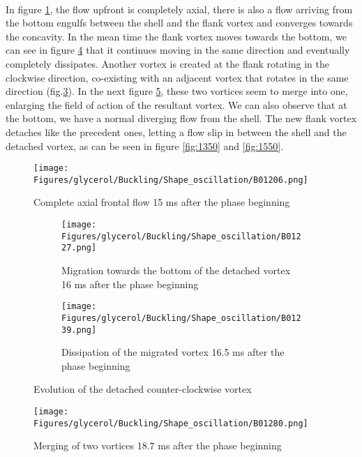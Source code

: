 \documentclass[a4paper,10pt]{report}
\begin{document}
\paragraph{}
In figure \ref{fig:1206}, the flow upfront is completely axial, there is also a flow arriving from the bottom engulfs between the shell and the flank vortex and converges towards the concavity. In the mean time the flank vortex moves towards the bottom, we can see in figure \ref{fig:dissipationmigrationVortexbottom} that it continues moving in the same direction and eventually completely dissipates. Another vortex is created at the flank rotating in the clockwise direction, co-existing with an adjacent vortex that rotates in the same direction (fig.\ref{fig:1239}). In the next figure \ref{fig:1280}, these two vortices seem to merge into one, enlarging the field of action of the resultant vortex. We can also observe that at the bottom, we have a normal diverging flow from the shell. The new flank vortex detaches like the precedent ones, letting a flow slip in between the shell and the detached vortex, as can be seen in figure \ref{fig:1350} and \ref{fig:1550}.
\begin{figure}[htbp]%
	\centering%
		\texttt{[image: Figures/glycerol/Buckling/Shape\_oscillation/B01206.png]}%
		\caption{Complete axial frontal flow 15 ms after the phase beginning}%
		\label{fig:1206}%
\end{figure}
\begin{figure}[htbp]%
	\centering%
		\begin{subfigure}[h]{0.5\textwidth}%
					\texttt{[image: Figures/glycerol/Buckling/Shape\_oscillation/B01227.png]}%
					\caption{Migration towards the bottom of the detached vortex 16 ms after the phase beginning}%
					\label{fig:migrationVortexbottom}%
			\end{subfigure}%
			\begin{subfigure}[h]{0.5\linewidth}%
					\texttt{[image: Figures/glycerol/Buckling/Shape\_oscillation/B01239.png]}%
					\caption{Dissipation of the migrated vortex 16.5 ms after the phase beginning}%
					\label{fig:1239}%
			\end{subfigure}%
		\caption{Evolution of the detached counter-clockwise vortex}
		\label{fig:dissipationmigrationVortexbottom}%
\end{figure}
\begin{figure}[htbp]%
	\centering%
		\texttt{[image: Figures/glycerol/Buckling/Shape\_oscillation/B01280.png]}%
		\caption{Merging of two vortices 18.7 ms after the phase beginning}%
		\label{fig:1280}%
\end{figure}
\end{document}
